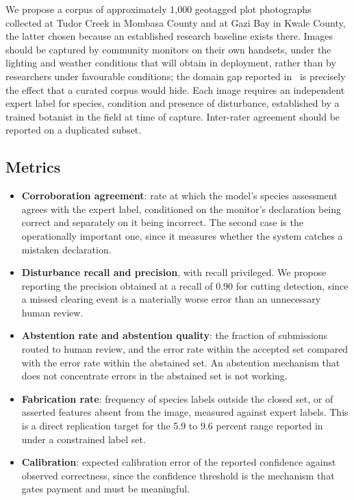 \documentclass[10pt,twocolumn,a4paper]{article}
\begin{document}
We propose a corpus of approximately 1{,}000 geotagged plot photographs
collected at Tudor Creek in Mombasa County and at Gazi Bay in Kwale County, the
latter chosen because an established research baseline exists there. Images
should be captured by community monitors on their own handsets, under the
lighting and weather conditions that will obtain in deployment, rather than by
researchers under favourable conditions; the domain gap reported
in~\cite{zhou2026} is precisely the effect that a curated corpus would hide.
Each image requires an independent expert label for species, condition and
presence of disturbance, established by a trained botanist in the field at time
of capture. Inter-rater agreement should be reported on a duplicated subset.

\subsection{Metrics}

\begin{itemize}
\item \textbf{Corroboration agreement}: rate at which the model's species
assessment agrees with the expert label, conditioned on the monitor's
declaration being correct and separately on it being incorrect. The second case
is the operationally important one, since it measures whether the system catches
a mistaken declaration.
\item \textbf{Disturbance recall and precision}, with recall privileged. We
propose reporting the precision obtained at a recall of 0.90 for cutting
detection, since a missed clearing event is a materially worse error than an
unnecessary human review.
\item \textbf{Abstention rate and abstention quality}: the fraction of
submissions routed to human review, and the error rate within the accepted set
compared with the error rate within the abstained set. An abstention mechanism
that does not concentrate errors in the abstained set is not working.
\item \textbf{Fabrication rate}: frequency of species labels outside the closed
set, or of asserted features absent from the image, measured against expert
labels. This is a direct replication target for the 5.9 to 9.6 percent range
reported in~\cite{zhou2026} under a constrained label set.
\item \textbf{Calibration}: expected calibration error of the reported
confidence against observed correctness, since the confidence threshold is the
mechanism that gates payment and must be meaningful.
\end{itemize}
\end{document}
